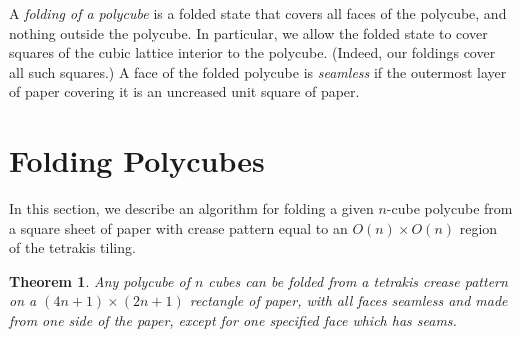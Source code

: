 \documentclass[11pt]{article}
\newtheorem{theorem}{Theorem}
\newcommand{\theolab}[1]{\label{theorem:#1}}
\begin{document}
A \emph{folding of a polycube} is a folded state that covers all faces
of the polycube, and nothing outside the polycube.  In particular, we
allow the folded state to cover squares of the cubic lattice
interior to the polycube.  (Indeed, our foldings cover all such squares.)
A face of the folded polycube is \emph{seamless} if the outermost layer of
paper covering it is an uncreased unit square of paper.










\section{Folding Polycubes}

In this section, we describe an algorithm for folding a given $n$-cube
polycube from a square sheet of paper with crease pattern equal
to an $O(n) \times O(n)$ region of the tetrakis tiling.



\begin{theorem} \theolab{rectangle seam}
  Any polycube of $n$ cubes can be folded from a tetrakis crease pattern
  on a $(4 n + 1) \times (2 n + 1)$ rectangle of paper,
  with all faces seamless and made from one side of the paper,
  except for one specified face which has seams.
\end{theorem}
\end{document}
